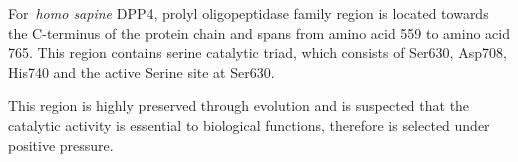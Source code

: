 For~\textit{homo sapine} DPP4, prolyl oligopeptidase family region is located towards the C-terminus of the protein chain and spans from amino acid 559 to amino acid 765. This region contains serine catalytic triad, which consists of Ser630, Asp708, His740 and the active Serine site at Ser630. \par
This region is highly preserved through evolution and is suspected that the catalytic activity is essential to biological functions, therefore is selected under positive pressure. 